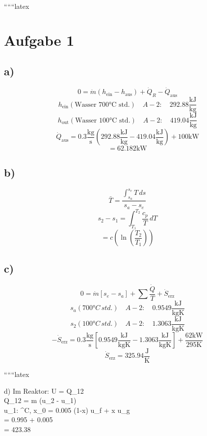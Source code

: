 
``````latex

\section*{Aufgabe 1}

\subsection*{a)}
\[
0 = \dot{m} (h_{\text{ein}} - h_{\text{aus}}) + \dot{Q}_R - \dot{Q}_{\text{aus}}
\]
\[
h_{\text{ein}} \left( \text{Wasser 700°C std.} \right) \quad A-2: \quad 292.88 \frac{\text{kJ}}{\text{kg}}
\]
\[
h_{\text{out}} \left( \text{Wasser 100°C std.} \right) \quad A-2: \quad 419.04 \frac{\text{kJ}}{\text{kg}}
\]
\[
\dot{Q}_{\text{aus}} = 0.3 \frac{\text{kg}}{\text{s}} \left( 292.88 \frac{\text{kJ}}{\text{kg}} - 419.04 \frac{\text{kJ}}{\text{kg}} \right) + 100 \text{kW}
\]
\[
= 62.182 \text{kW}
\]

\subsection*{b)}
\[
\bar{T} = \frac{\int_{s_a}^{s_e} T \, ds}{s_a - s_e}
\]
\[
s_2 - s_1 = \int_{T_1}^{T_2} \frac{c_p}{T} \, dT
\]
\[
= c \left( \ln \left( \frac{T_2}{T_1} \right) \right)
\]

\subsection*{c)}
\[
0 = \dot{m} \left[ s_e - s_a \right] + \sum \frac{\dot{Q}}{T} + \dot{S}_{\text{erz}}
\]
\[
s_a \left( 700°C \, std. \right) \quad A-2: \quad 0.9549 \frac{\text{kJ}}{\text{kgK}}
\]
\[
s_2 \left( 100°C \, std. \right) \quad A-2: \quad 1.3063 \frac{\text{kJ}}{\text{kgK}}
\]
\[
- \dot{S}_{\text{erz}} = 0.3 \frac{\text{kg}}{\text{s}} \left[ 0.9549 \frac{\text{kJ}}{\text{kgK}} - 1.3063 \frac{\text{kJ}}{\text{kgK}} \right] + \frac{62 \text{kW}}{295 \text{K}}
\]
\[
\dot{S}_{\text{erz}} = 325.94 \frac{\text{J}}{\text{K}}
\]

``````latex


d) Im Reaktor: \quad \Delta U = Q_{12} \checkmark \\
Q_{12} = m \cdot (u_2 - u_1) \\

u_1: ^\circ C, \quad x_0 = 0.005 \quad {} \quad (1-x) \cdot u_f + x \cdot u_g \\
\quad = 0.995   + 0.005   \\
\quad = 423.38  \\

